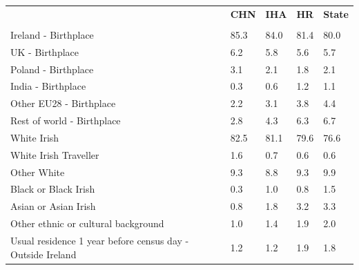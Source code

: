 \documentclass{article}
\begin{document}
\pagebreak
\begin{table}[h]	
\centering
		\begin{tabular}{KTTTT}
  \hline
& \textbf{CHN} & \textbf{IHA} & \textbf{HR}& \textbf{State}\\ 
  \hline
    \\ 
    \hline
Ireland - Birthplace & 85.3& 84.0& 81.4& 80.0\\
UK - Birthplace & 6.2& 5.8& 5.6& 5.7\\
Poland - Birthplace & 3.1& 2.1& 1.8& 2.1\\
India - Birthplace & 0.3& 0.6& 1.2& 1.1\\
Other EU28 - Birthplace & 2.2& 3.1& 3.8& 4.4\\
Rest of world - Birthplace & 2.8& 4.3& 6.3& 6.7\\
    \hline
White Irish & 82.5& 81.1& 79.6& 76.6\\
White Irish Traveller & 1.6& 0.7& 0.6& 0.6\\
Other White & 9.3& 8.8& 9.3& 9.9\\
Black or Black Irish & 0.3& 1.0& 0.8& 1.5\\
Asian or Asian Irish & 0.8& 1.8& 3.2& 3.3\\
Other ethnic or cultural background & 1.0& 1.4& 1.9& 2.0\\
    \hline
Usual residence 1 year before census day - Outside Ireland & 1.2& 1.2& 1.9& 1.8\\


\end{tabular}
\end{table}
\end{document}
